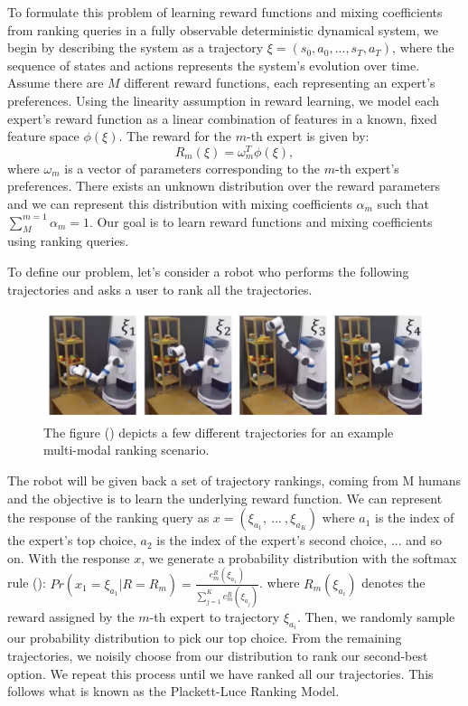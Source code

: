 \documentclass[
  letterpaper,
  DIV=11,
  numbers=noendperiod,
  oneside]{scrreprt}
\theoremstyle{remark}
\begin{document}
To formulate this problem of learning reward functions and mixing
coefficients from ranking queries in a fully observable deterministic
dynamical system, we begin by describing the system as a trajectory
\(\xi = (s_0, a_0, ..., s_T, a_T)\), where the sequence of states and
actions represents the system's evolution over time. Assume there are
\(M\) different reward functions, each representing an expert's
preferences. Using the linearity assumption in reward learning, we model
each expert's reward function as a linear combination of features in a
known, fixed feature space \(\phi(\xi)\). The reward for the \(m\)-th
expert is given by: \[R_m(\xi) = \omega^T_m \phi(\xi),\] where
\(\omega_m\) is a vector of parameters corresponding to the \(m\)-th
expert's preferences. There exists an unknown distribution over the
reward parameters and we can represent this distribution with mixing
coefficients \(\alpha_m\) such that \(\sum_M^{m = 1} \alpha_m = 1\). Our
goal is to learn reward functions and mixing coefficients using ranking
queries.

To define our problem, let's consider a robot who performs the following
trajectories and asks a user to rank all the trajectories.

\begin{figure}

{\centering \includegraphics{Figures/robot-traj.png}

}

\caption{The figure () depicts a few different trajectories for an example multi-modal
ranking scenario.}

\end{figure}%

The robot will be given back a set of trajectory rankings, coming from M
humans and the objective is to learn the underlying reward function. We
can represent the response of the ranking query as
\(x = (\xi_{a_1},\ ...\ ,\xi_{a_K})\) where \(a_1\) is the index of the
expert's top choice, \(a_2\) is the index of the expert's second choice,
... and so on. With the response \(x\), we generate a probability
distribution with the softmax rule
():
\(Pr(x_1 = \xi_{a_1} | R = R_m) = \frac{e^R_m(\xi_{a_1})}{\sum_{j=1}^Ke^R_m(\xi_{a_j})}\).
where \(R_m(\xi_{a_i})\) denotes the reward assigned by the \(m\)-th
expert to trajectory \(\xi_{a_i}\). Then, we randomly sample our
probability distribution to pick our top choice. From the remaining
trajectories, we noisily choose from our distribution to rank our
second-best option. We repeat this process until we have ranked all our
trajectories. This follows what is known as the Plackett-Luce Ranking
Model.
\end{document}
